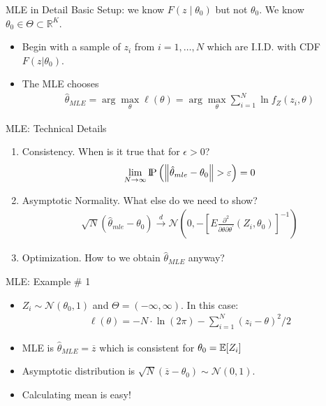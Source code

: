 \begin{frame}{MLE in Detail}
Basic Setup: we know $F(z \mid \theta_0)$ but not $\theta_0$. We know $\theta_0 \in \Theta \subset \mathbb{R}^K$.
\begin{itemize}
\item Begin with a sample of $z_i$ from $i=1,\ldots,N$ which are I.I.D. with CDF $F(z|\theta_0)$.
\item The MLE chooses
\begin{align*}
\widehat{\theta}_{MLE} = \arg \max_{\theta} \ell(\theta) = \arg \max_{\theta} \sum_{i=1}^N \ln f_Z(z_i,\theta)
\end{align*}
\end{itemize}
\end{frame}


\begin{frame}{MLE: Technical Details}
\begin{enumerate}
\item Consistency. When is it true that for $\epsilon>0$?
\begin{align*}
\lim _ { N \rightarrow \infty } \text{I\kern-0.15em P} \left( \left\| \hat { \theta } _ { m l e } - \theta _ { 0 } \right\| > \varepsilon \right) = 0
\end{align*}
\item Asymptotic Normality. What else do we need to show?
\begin{align*}
\sqrt { N } \left( \hat { \theta } _ { m l e } - \theta _ { 0 } \right) \stackrel { d } { \longrightarrow } \mathcal { N } \left( 0 , - \left[ E \frac { \partial ^ { 2 } } { \partial \theta \partial \theta ^ { \prime } } \left( Z _ { i } , \theta _ { 0 } \right) \right] ^ { - 1 } \right)
\end{align*}
\item Optimization. How to we obtain $\widehat{\theta}_{MLE}$ anyway?
\end{enumerate}
\end{frame}


\begin{frame}{MLE: Example \# 1}
\begin{itemize}
\item $Z_i \sim \mathcal{N}(\theta_0,1)$ and $\Theta = (-\infty,\infty)$. In this case:
\begin{align*}
\ell ( \theta ) = - N \cdot \ln ( 2 \pi ) - \sum _ { i = 1 } ^ { N } \left( z _ { i } - \theta \right) ^ { 2 } / 2
\end{align*}
\item MLE is $\widehat{\theta}_{MLE}=\overline{z}$ which is consistent for $\theta_0 = \mathbb{E}[Z_i]$
\item Asymptotic distribution is $\sqrt{N} ( \overline{z}-\theta_0) \sim \mathcal{N}(0,1)$.
\item Calculating mean is easy!
\end{itemize}
\end{frame}




